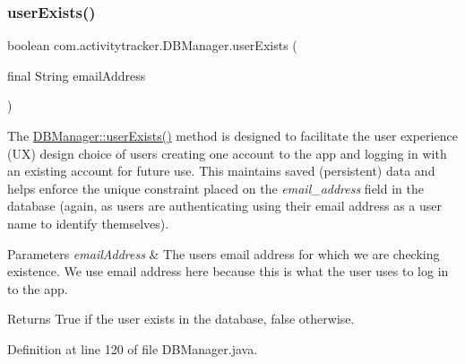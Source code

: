 \subsubsection{\texorpdfstring{userExists()}{userExists()}}
{\footnotesize\ttfamily boolean com.\+activitytracker.\+D\+B\+Manager.\+user\+Exists (\begin{DoxyParamCaption}\item[{final String}]{email\+Address }\end{DoxyParamCaption})}

The \mbox{\hyperlink{classcom_1_1activitytracker_1_1_d_b_manager_af05d79f33ecf2920a67d1b9cf82c079f}{D\+B\+Manager\+::user\+Exists()}} method is designed to facilitate the user experience (UX) design choice of users creating one account to the app and logging in with an existing account for future use. This maintains saved (persistent) data and helps enforce the unique constraint placed on the {\itshape email\+\_\+address} field in the database (again, as users are authenticating using their email address as a user name to identify themselves).


\begin{DoxyParams}{Parameters}
{\em email\+Address} & The user\textquotesingle{}s email address for which we are checking existence. We use email address here because this is what the user uses to log in to the app. \\
\hline
\end{DoxyParams}
\begin{DoxyReturn}{Returns}
True if the user exists in the database, false otherwise. 
\end{DoxyReturn}


Definition at line 120 of file D\+B\+Manager.\+java.


\begin{DoxyCode}{0}

\end{DoxyCode}


